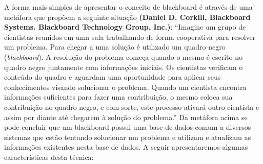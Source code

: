 	A forma mais simples de apresentar o conceito de blackboard é através de uma metáfora que propõem a seguinte situação \textbf{(Daniel D. Corkill, Blackboard Systems. Blackboard Technology Group, Inc.)}:
 “Imagine um grupo de cientistas reunidos em uma sala trabalhando de forma cooperativa para resolver um problema. Para chegar a uma solução é utilizado um quadro negro (\textit{blackboard}).
A resolução do problema começa quando o mesmo é escrito no quadro negro juntamente com informações iniciais. Os cientistas verificam o conteúdo do quadro e aguardam uma oportunidade para aplicar seus conhecimentos visando solucionar o problema. Quando um cientista encontra informações suficientes para fazer uma contribuição, o mesmo coloca sua contribuição no quadro negro, e com sorte, este processo ativará outro cientista e assim por diante até chegarem à solução do problema.”
	Da metáfora acima se pode concluir que um blackboard possui uma base de dados comum a diversos sistemas que estão tentando solucionar um problema e utilizam e atualizam as informações existentes nesta base de dados.
	 A seguir apresentaremos algumas características desta técnica:
